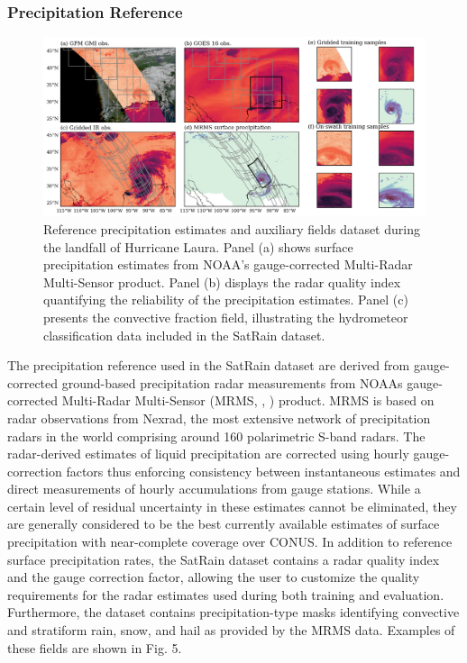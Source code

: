 \documentclass[11pt]{article}
\begin{document}
\subsubsection{Precipitation Reference}

\begin{figure}[htbp] %
	\centering
	\includegraphics[width=1.0\textwidth]{figures/fig05}
	\caption{
		Reference precipitation estimates and auxiliary fields dataset during
		the landfall of Hurricane Laura. Panel (a) shows surface precipitation
		estimates from NOAA’s gauge-corrected Multi-Radar Multi-Sensor product.
		Panel (b) displays the radar quality index quantifying the reliability
		of the precipitation estimates. Panel (c) presents the convective
		fraction field, illustrating the hydrometeor classification data
		included in the SatRain dataset.
	}
	\label{fig:observations_geo}
\end{figure}

The precipitation reference used in the SatRain dataset are derived from
gauge-corrected ground-based precipitation radar measurements from NOAAs
gauge-corrected Multi-Radar Multi-Sensor (MRMS, \citeauthor{Smith2016MRMS},
\citeyear{Smith2016MRMS}) product. MRMS is based on radar observations from
Nexrad, the most extensive network of precipitation radars in the world
comprising around 160 polarimetric S-band radars. The radar-derived estimates of
liquid precipitation are corrected using hourly gauge-correction factors thus
enforcing consistency between instantaneous estimates and direct measurements of
hourly accumulations from gauge stations. While a certain level of residual
uncertainty in these estimates cannot be eliminated, they are generally
considered to be the best currently available estimates of surface precipitation
with near-complete coverage over CONUS. In addition to reference surface
precipitation rates, the SatRain dataset contains a radar quality index and the
gauge correction factor, allowing the user to customize the quality requirements
for the radar estimates used during both training and evaluation. Furthermore,
the dataset contains precipitation-type masks identifying convective and
stratiform rain, snow, and hail as provided by the MRMS data. Examples of these
fields are shown in Fig. 5.
\end{document}
